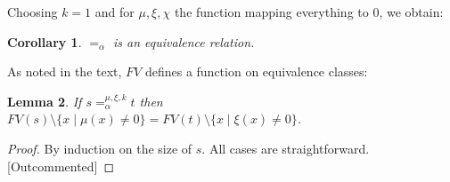 \documentclass{lmcs}
\theoremstyle{theorem}\newtheorem{theorem}{Theorem}
\theoremstyle{theorem}\newtheorem{lemma}[theorem]{Lemma}
\theoremstyle{theorem}\newtheorem{corollary}[theorem]{Corollary}
\theoremstyle{definition}\newtheorem{definition}[theorem]{Definition}
\theoremstyle{definition}\newtheorem{example}[theorem]{Example}
\newcommand{\Vfree}{\mathcal{V}_{\mathit{nonb}}}
\newcommand{\Vbound}{\mathcal{V}_{\mathit{binder}}}
\newcommand{\FV}{\mathit{FV}}
\newcommand{\identifier}[1]{\mathtt{#1}}
\newcommand{\afun}{\identifier{f}}
\newcommand{\avar}{x}
\newcommand{\bvar}{y}
\newcommand{\abs}[2]{\lambda #1.#2}
\begin{document}
Choosing $k = 1$ and for $\mu,\xi,\chi$ the function mapping everything to $0$,
we obtain:

\begin{corollary}\label{corr:alphaequiv}
$=_\alpha$ is an equivalence relation.
\end{corollary}

As noted in the text, $\FV$ defines a function on equivalence classes:

\begin{lemma}\label{lem:alphafreevar}
If $s =_\alpha^{\mu,\xi,k} t$ then $\FV(s) \setminus \{ x \mid \mu(x) \neq 0 \} = \FV(t) \setminus \{ x \mid \xi(x) \neq 0 \}$.
\end{lemma}

\begin{proof}
By induction on the size of $s$.
All cases are straightforward. [Outcommented]

\end{proof}
\end{document}
